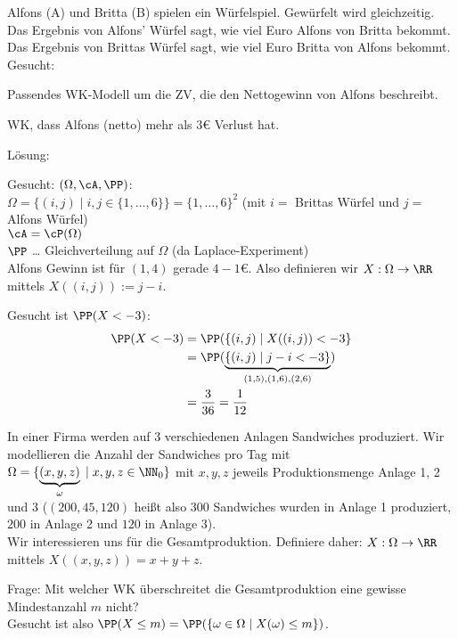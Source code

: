  Alfons (A) und Britta (B) spielen ein Würfelspiel. Gewürfelt wird gleichzeitig. Das Ergebnis von Alfons' Würfel sagt, wie viel Euro Alfons von Britta bekommt. Das Ergebnis von Brittas Würfel sagt, wie viel Euro Britta von Alfons bekommt.\\
Gesucht:
\begin{anumerate}
\item Passendes WK-Modell um die ZV, die den Nettogewinn von Alfons beschreibt.
\item WK, dass Alfons (netto) mehr als $3$\euro{} Verlust hat.
\end{anumerate}
Lösung:
\begin{anumerate}
\item Gesucht: $(\Omega, \cA, \PP)$:\\
$\Omega = \{(i,j) \;|\; i,j \in \{1,\dots,6\}\}=\{1,\dots,6\}^2$ (mit $i=$ Brittas Würfel und $j=$Alfons Würfel)\\
$\cA = \cP (\Omega)$\\
$\PP$ … Gleichverteilung auf $\Omega$ (da Laplace-Experiment)\\
Alfons Gewinn ist für $(1,4)$ gerade $4-1$\euro{}. Also definieren wir $X: \Omega \to \RR$ mittels $X((i,j)):=j-i$.
\item Gesucht ist $\PP(X<-3)$:
\begin{align*}
\PP(X < -3) &= \PP(\{(i,j) \;|\; X((i,j)) < -3\}\\
&= \PP(\underbrace{\{(i,j)\;|\; j-i < -3\}}_{(1,5), (1,6), (2,6)})\\
&= \frac{3}{36}=\frac{1}{12}
\end{align*}
\end{anumerate}

 In einer Firma werden auf 3 verschiedenen Anlagen Sandwiches produziert. Wir modellieren die Anzahl der Sandwiches pro Tag mit $\Omega = \{ \underbrace{(x,y,z)}_{\omega} \;|\; x,y,z \in \NN_0\}$ mit $x,y,z$ jeweils Produktionsmenge Anlage 1, 2 und 3 ($(200,45,120)$ heißt also $300$ Sandwiches wurden in Anlage 1 produziert, $200$ in Anlage 2 und $120$ in Anlage 3).\\
Wir interessieren uns für die Gesamtproduktion. Definiere daher: $X:\Omega \to \RR$ mittels $X((x,y,z)) = x+ y+z$.

Frage: Mit welcher WK überschreitet die Gesamtproduktion eine gewisse Mindestanzahl $m$ nicht?\\
Gesucht ist also $\PP(X\leq m)=\PP(\{\omega \in \Omega \;|\; X(\omega) \leq m\})$.

